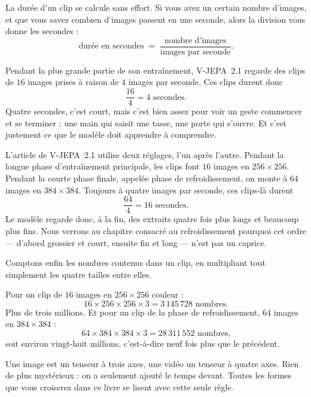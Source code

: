 La durée d'un clip se calcule sans effort. Si vous avez un certain nombre
d'images, et que vous savez combien d'images passent en une seconde, alors
la division vous donne les secondes :
\[
  \text{durée en secondes} \;=\; \frac{\text{nombre d'images}}
                                      {\text{images par seconde}}.
\]

\begin{exemple}
Pendant la plus grande partie de son entraînement, V-JEPA~2.1 regarde des
clips de $16$ images prises à raison de $4$ images par seconde. Ces clips
durent donc
\[
  \frac{16}{4} = 4 \text{ secondes.}
\]
Quatre secondes, c'est court, mais c'est bien assez pour voir un geste
commencer et se terminer : une main qui saisit une tasse, une porte qui
s'ouvre. Et c'est justement ce que le modèle doit apprendre à comprendre.
\end{exemple}

\begin{surlesdonnees}
L'article de V-JEPA~2.1 utilise deux réglages, l'un après l'autre. Pendant
la longue phase d'entraînement principale, les clips font $16$ images en
$256 \times 256$. Pendant la courte phase finale, appelée phase de
refroidissement, on monte à $64$ images en $384 \times 384$. Toujours à
quatre images par seconde, ces clips-là durent
\[
  \frac{64}{4} = 16 \text{ secondes.}
\]
Le modèle regarde donc, à la fin, des extraits quatre fois plus longs et
beaucoup plus fins. Nous verrons au chapitre consacré au refroidissement
pourquoi cet ordre — d'abord grossier et court, ensuite fin et long — n'est
pas un caprice.
\end{surlesdonnees}

Comptons enfin les nombres contenus dans un clip, en multipliant tout
simplement les quatre tailles entre elles.

\begin{exemple}
Pour un clip de $16$ images en $256 \times 256$ couleur :
\[
  16 \times 256 \times 256 \times 3 = 3\,145\,728 \text{ nombres.}
\]
Plus de trois millions. Et pour un clip de la phase de refroidissement,
$64$ images en $384 \times 384$ :
\[
  64 \times 384 \times 384 \times 3 = 28\,311\,552 \text{ nombres,}
\]
soit environ vingt-huit millions, c'est-à-dire neuf fois plus que le
précédent.
\end{exemple}

\begin{aretenir}
Une image est un tenseur à trois axes, une vidéo un tenseur à quatre axes.
Rien de plus mystérieux : on a seulement ajouté le temps devant. Toutes les
formes que vous croiserez dans ce livre se lisent avec cette seule règle.
\end{aretenir}

